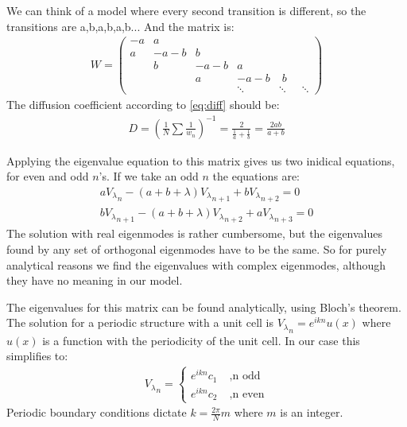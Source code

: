 \documentclass[onecolumn,fleqn,notitlepage,secnumarabic]{revtex4}
\begin{document}
We can think of a model where every second transition is different, so the transitions are a,b,a,b,a,b... And the matrix is:
\begin{align}
W = 
\begin{pmatrix}
-a  & a \\
a  & -a-b &  b \\
 & b & -a-b &  a \\
& & a & -a-b & \; b \\
& & & \ddots &\ddots&\;\;\ddots
\end{pmatrix}
\end{align}
The diffusion coefficient according to \ref{eq:diff} should be:
\begin{align}\label{eq:D_alter}
D = \left(\frac{1}{N}\sum\frac{1}{w_n}\right)^{-1} = \frac{2}{\frac{1}{a} + \frac{1}{b}} = \frac{2ab}{a+b}
\end{align}

Applying the eigenvalue equation to this matrix gives us two inidical equations, for even and odd $n$'s. If we take an odd $n$ the equations are:
\begin{align}
a {V_\lambda}_n - (a+b+\lambda){V_\lambda}_{n+1} + b {V_\lambda}_{n+2} =0  \\
b {V_\lambda}_{n+1} - (a+b+\lambda){V_\lambda}_{n+2} + a {V_\lambda}_{n+3} =0 
\end{align}
The solution with real eigenmodes is rather cumbersome, but the eigenvalues found by any set of orthogonal eigenmodes have to be the same. So for purely analytical reasons we find the eigenvalues with complex eigenmodes, although they have no meaning in our model.


The eigenvalues for this matrix can be found analytically, using Bloch's theorem. The solution for a periodic structure with a unit cell is ${V_\lambda}_n = e^{ikn} u(x)$ where $u(x)$ is a function with the periodicity of the unit cell. In our case this simplifies to:
\begin{align}
{V_\lambda}_n = \begin{cases}e^{ikn} c_1 \; &, \text{n odd} \\ e^{ikn} c_2 \; &, \text{n even} \end{cases}
\end{align}
Periodic boundary conditions dictate $k=\frac{2\pi}{N}m$ where $m$ is an integer.
\end{document}
